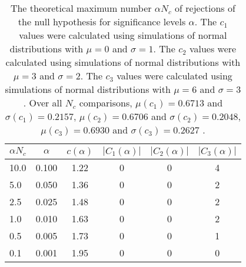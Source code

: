 \begin{table}[h!]
\begin{center}
\begin{tabular}{| l | c | c | c | c | c |}\hline
$\alpha N_c$ & $\alpha$ & $c(\alpha)$ & $|C_1(\alpha)|$ & $|C_2(\alpha)|$ & $|C_3(\alpha)|$ \\\hline\hline
10.0 & 0.100 & 1.22 & 0 & 0 & 4 \\\hline
5.0 & 0.050 & 1.36 & 0 & 0 & 2 \\\hline
2.5 & 0.025 & 1.48 & 0 & 0 & 2 \\\hline
1.0 & 0.010 & 1.63 & 0 & 0 & 2 \\\hline
0.5 & 0.005 & 1.73 & 0 & 0 & 1 \\\hline
0.1 & 0.001 & 1.95 & 0 & 0 & 0 \\\hline
\end{tabular}
\caption{The theoretical maximum number $\alpha N_c$ of rejections
of the null hypothesis for significance levels $\alpha$.
The $c_1$ values were calculated using simulations of normal distributions with $\mu=0$ and $\sigma=1$.
The $c_2$ values were calculated using simulations of normal distributions with $\mu=3$ and $\sigma=2$.
The $c_3$ values were calculated using simulations of normal distributions with $\mu=6$ and $\sigma=3$.
Over all $N_c$ comparisons,
 $\mu(c_1)=0.6713$ and $\sigma(c_1)=0.2157$,
 $\mu(c_2)=0.6706$ and $\sigma(c_2)=0.2048$,
 $\mu(c_3)=0.6930$ and $\sigma(c_3)=0.2627$ .
}
\end{center}
\end{table}